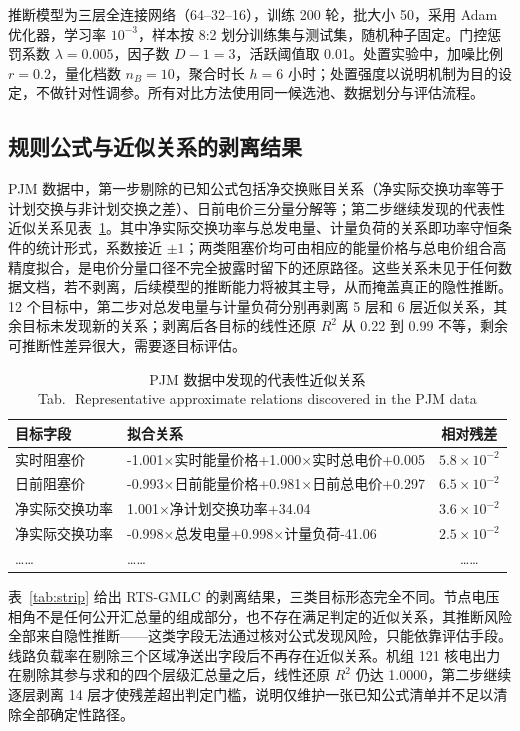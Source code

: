 \documentclass[UTF8,zihao=5,twoside]{ctexart}
\newcommand{\tabbicaption}[2]{\caption{#1\\[-0.2em]\small Tab.\,\thetable\ #2}}
\begin{document}
推断模型为三层全连接网络（64--32--16），训练 200 轮，批大小 50，采用 Adam 优化器\cite{ref-kingma-adam}，学习率 $10^{-3}$，样本按 8:2 划分训练集与测试集，随机种子固定。门控惩罚系数 $\lambda=0.005$，因子数 $D-1=3$，活跃阈值取 0.01。处置实验中，加噪比例 $r=0.2$，量化档数 $n_B=10$，聚合时长 $h=6$ 小时；处置强度以说明机制为目的设定，不做针对性调参。所有对比方法使用同一候选池、数据划分与评估流程。

\subsection{规则公式与近似关系的剥离结果}

PJM 数据中，第一步剔除的已知公式包括净交换账目关系（净实际交换功率等于计划交换与非计划交换之差）、日前电价三分量分解等；第二步继续发现的代表性近似关系见表~\ref{tab:formula}。其中净实际交换功率与总发电量、计量负荷的关系即功率守恒条件的统计形式，系数接近 $\pm 1$；两类阻塞价均可由相应的能量价格与总电价组合高精度拟合，是电价分量口径不完全披露时留下的还原路径。这些关系未见于任何数据文档，若不剥离，后续模型的推断能力将被其主导，从而掩盖真正的隐性推断。12 个目标中，第二步对总发电量与计量负荷分别再剥离 5 层和 6 层近似关系，其余目标未发现新的关系；剥离后各目标的线性还原 $R^2$ 从 0.22 到 0.99 不等，剩余可推断性差异很大，需要逐目标评估。

\begin{table}[!tbp]
\centering
\tabbicaption{PJM 数据中发现的代表性近似关系}{Representative approximate relations discovered in the PJM data}
\label{tab:formula}
\setlength{\tabcolsep}{2.6pt}
\begin{tabular}{p{1.72cm}p{3.62cm}c}
\toprule
目标字段 & 拟合关系 & 相对残差 \\
\midrule
实时阻塞价 & -1.001$\times$实时能量价格+1.000$\times$实时总电价+0.005 & $5.8\times10^{-2}$ \\
日前阻塞价 & -0.993$\times$日前能量价格+0.981$\times$日前总电价+0.297 & $6.5\times10^{-2}$ \\
净实际交换功率 & 1.001$\times$净计划交换功率+34.04 & $3.6\times10^{-2}$ \\
净实际交换功率 & -0.998$\times$总发电量+0.998$\times$计量负荷-41.06 & $2.5\times10^{-2}$ \\
…… & …… & …… \\
\bottomrule
\end{tabular}
\end{table}

表~\ref{tab:strip} 给出 RTS-GMLC 的剥离结果，三类目标形态完全不同。节点电压相角不是任何公开汇总量的组成部分，也不存在满足判定的近似关系，其推断风险全部来自隐性推断——这类字段无法通过核对公式发现风险，只能依靠评估手段。线路负载率在剔除三个区域净送出字段后不再存在近似关系。机组 121 核电出力在剔除其参与求和的四个层级汇总量之后，线性还原 $R^2$ 仍达 1.0000，第二步继续逐层剥离 14 层才使残差超出判定门槛，说明仅维护一张已知公式清单并不足以清除全部确定性路径。
\end{document}
